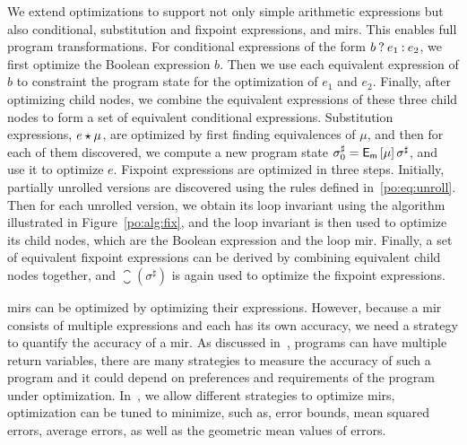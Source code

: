 We extend optimizations to support not only simple arithmetic expressions but
also conditional, substitution and fixpoint expressions, and \glspl{mir}.  This
enables full program transformations.  For conditional expressions of the form
$b\mathbin{?} e_1\mathbin{:} e_2$, we first optimize the Boolean expression $b$.  Then
we use each equivalent expression of $b$ to constraint the program state for
the optimization of $e_1$ and $e_2$.  Finally, after optimizing child nodes,
we combine the equivalent expressions of these three child nodes to form a
set of equivalent conditional expressions.  Substitution expressions, $e
\mathbin{\star} \mu$, are optimized by first finding equivalences of $\mu$, and then
for each of them discovered, we compute a new program state $\sigma^\sharp_0
= \operatorname{\mathsf{E}_\mathsf{m}}\left[{\mu}\right] \sigma^\sharp$, and use it to optimize $e$.  Fixpoint
expressions are optimized in three steps.  Initially, partially unrolled
versions are discovered using the rules defined in~\eqref{po:eq:unroll}.  Then
for each unrolled version, we obtain its loop invariant using the algorithm
illustrated in Figure~\ref{po:alg:fix}, and the loop invariant is then used
to optimize its child nodes, which are the Boolean expression and the loop
\gls{mir}\@.  Finally, a set of equivalent fixpoint expressions can be derived
by combining equivalent child nodes together, and $\closure(\sigma^\sharp)$ is
again used to optimize the fixpoint expressions.

\glspl{mir} can be optimized by optimizing their expressions.  However, because
a \gls{mir} consists of multiple expressions and each has its own accuracy,
we need a strategy to quantify the accuracy of a \gls{mir}\@.  As discussed
in~\cite{martel09}, programs can have multiple return variables, there are many
strategies to measure the accuracy of such a program and it could depend on
preferences and requirements of the program under optimization.  In~\soap, we
allow different strategies to optimize \glspl{mir}, optimization can be tuned
to minimize, such as, error bounds, mean squared errors, average errors, as
well as the geometric mean values of errors.
